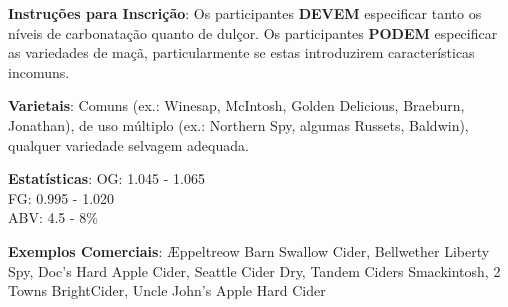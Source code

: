 \textbf{Instruções para Inscrição}: Os participantes \textbf{DEVEM} especificar tanto os níveis de carbonatação quanto de dulçor. Os participantes \textbf{PODEM} especificar as variedades de maçã, particularmente se estas introduzirem características incomuns.

\textbf{Varietais}: Comuns (ex.: Winesap, McIntosh, Golden Delicious, Braeburn, Jonathan), de uso múltiplo (ex.: Northern Spy, algumas Russets, Baldwin), qualquer variedade selvagem adequada.

\textbf{Estatísticas}: OG: 1.045 - 1.065 \\
\phantom{ } \hspace{16.5mm} FG: 0.995 - 1.020 \\
\phantom{ } \hspace{16.5mm} ABV: 4.5 - 8\%

\textbf{Exemplos Comerciais}: Æppeltreow Barn Swallow Cider, Bellwether Liberty Spy, Doc’s Hard Apple Cider, Seattle Cider Dry, Tandem Ciders Smackintosh, 2 Towns BrightCider, Uncle John’s Apple Hard Cider
